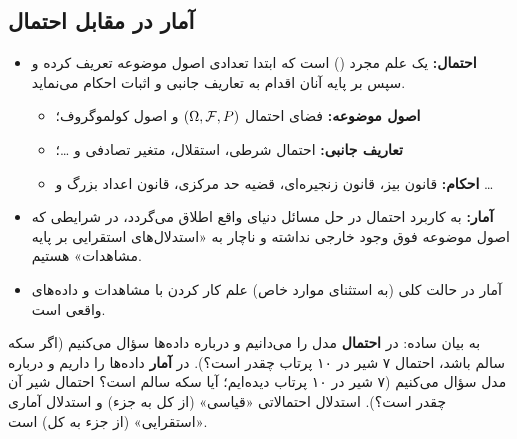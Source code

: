\subsection{آمار در مقابل احتمال}
\begin{itemize}
\item \textcolor{red!70!black}{\textbf{احتمال:}} یک علم مجرد () است که ابتدا تعدادی اصول موضوعه تعریف کرده و سپس بر پایه آنان اقدام به تعاریف جانبی و اثبات احکام می‌نماید.
\begin{itemize}
\item \textbf{اصول موضوعه:} فضای احتمال $(\Omega,\mathcal{F},P)$ و اصول کولموگروف؛
\item \textbf{تعاریف جانبی:} احتمال شرطی، استقلال، متغیر تصادفی و \ldots؛
\item \textbf{احکام:} قانون بیز، قانون زنجیره‌ای، قضیه حد مرکزی، قانون اعداد بزرگ و \ldots
\end{itemize}
\item \textcolor{red!70!black}{\textbf{آمار:}} به کاربرد احتمال در حل مسائل دنیای واقع اطلاق می‌گردد، در شرایطی که اصول موضوعه فوق وجود خارجی نداشته و ناچار به «استدلال‌های استقرایی بر پایه مشاهدات» هستیم.
\item آمار در حالت کلی (به استثنای موارد خاص) علم کار کردن با مشاهدات و داده‌های واقعی است.
\end{itemize}

\begin{note}
\notetitle به بیان ساده: در \textbf{احتمال} مدل را می‌دانیم و درباره داده‌ها سؤال می‌کنیم (اگر سکه سالم باشد، احتمال ۷ شیر در ۱۰ پرتاب چقدر است؟). در \textbf{آمار} داده‌ها را داریم و درباره مدل سؤال می‌کنیم (۷ شیر در ۱۰ پرتاب دیده‌ایم؛ آیا سکه سالم است؟ احتمال شیر آن چقدر است؟). استدلال احتمالاتی «قیاسی» (از کل به جزء) و استدلال آماری «استقرایی» (از جزء به کل) است.
\end{note}

